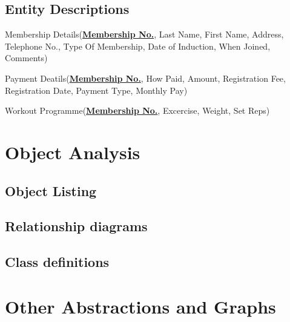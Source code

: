 \subsection{Entity Descriptions}

Membership Details(\textbf{\underline{Membership No.}}, Last Name, First Name, Address, Telephone No., Type Of Membership, Date of Induction, When Joined, Comments)

Payment Deatils(\textbf{\underline{Membership No.}}, How Paid, Amount, Registration Fee, Registration Date, Payment Type, Monthly Pay)

Workout Programme(\textbf{\underline{Membership No.}}, Excercise, Weight, Set Reps)

\section{Object Analysis}

\subsection{Object Listing}

\subsection{Relationship diagrams}

\subsection{Class definitions}

\section{Other Abstractions and Graphs}

